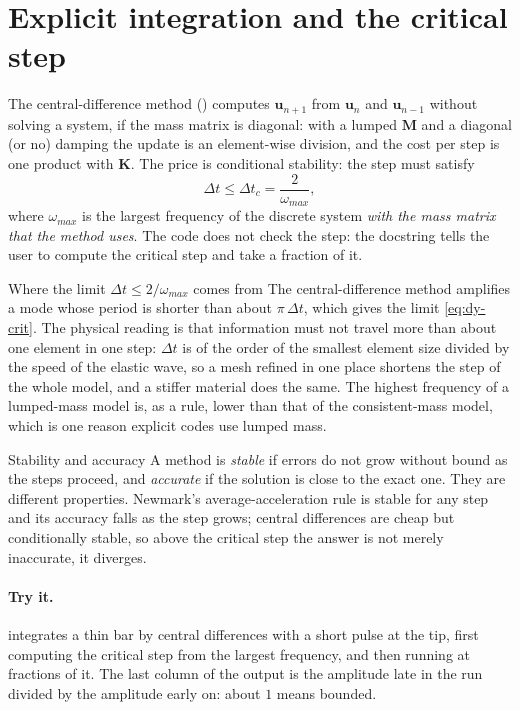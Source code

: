 \section{Explicit integration and the critical step}\label{sec:dy-explicit}

The central-difference method () computes $\bm u_{n+1}$ from $\bm u_n$ and $\bm u_{n-1}$ without solving a system, if the mass matrix is diagonal: with a lumped $\bm M$ and a diagonal (or no) damping the update is an element-wise division, and the cost per step is one product with $\bm K$. The price is conditional stability: the step must satisfy
\begin{equation}\label{eq:dy-crit}
\Delta t\le\Delta t_c=\frac{2}{\omega_{max}},
\end{equation}
where $\omega_{max}$ is the largest frequency of the discrete system \emph{with the mass matrix that the method uses}. The code does not check the step: the docstring tells the user to compute the critical step and take a fraction of it.

\begin{sidenote}{Where the limit $\Delta t\le2/\omega_{max}$ comes from}
The central-difference method amplifies a mode whose period is shorter than about $\pi\,\Delta t$, which gives the limit \eqref{eq:dy-crit}. The physical reading is that information must not travel more than about one element in one step: $\Delta t$ is of the order of the smallest element size divided by the speed of the elastic wave, so a mesh refined in one place shortens the step of the whole model, and a stiffer material does the same. The highest frequency of a lumped-mass model is, as a rule, lower than that of the consistent-mass model, which is one reason explicit codes use lumped mass.
\end{sidenote}

\begin{sidenote}{Stability and accuracy}
A method is \emph{stable} if errors do not grow without bound as the steps proceed, and \emph{accurate} if the solution is close to the exact one. They are different properties. Newmark's average-acceleration rule is stable for any step and its accuracy falls as the step grows; central differences are cheap but conditionally stable, so above the critical step the answer is not merely inaccurate, it diverges.
\end{sidenote}

\paragraph{Try it.}  integrates a thin bar by central differences with a short pulse at the tip, first computing the critical step from the largest frequency, and then running at fractions of it. The last column of the output is the amplitude late in the run divided by the amplitude early on: about $1$ means bounded.

